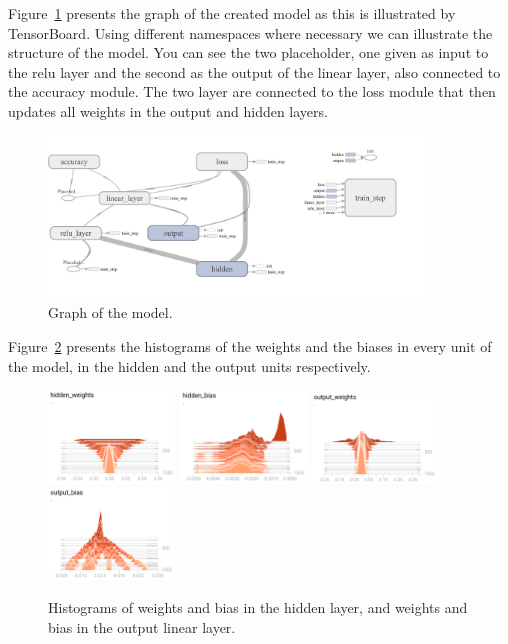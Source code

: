 \documentclass{article}
\begin{document}
Figure~\ref{fig:graph} presents the graph of the created model as this is illustrated by TensorBoard.
Using different namespaces where necessary we can illustrate the structure of the model.
You can see the two placeholder, one given as input to the relu layer and the second as the output of the linear layer, also connected to the accuracy module.
The two layer are connected to the loss module that then updates all weights in the output and hidden layers.



\begin{figure}
\centering
\includegraphics[width=0.9\textwidth]{graph.png}
\caption{Graph of the model.}
\label{fig:graph}
\end{figure}

Figure~\ref{fig:histogramsunits} presents the histograms of the weights and the biases in every unit of the model, in the hidden and the output units respectively.

\begin{figure}
\centering
\includegraphics[width=0.3\textwidth]{hidden_weights.png}
\includegraphics[width=0.3\textwidth]{hidden_bias.png}
\includegraphics[width=0.3\textwidth]{output_weights.png}
\includegraphics[width=0.3\textwidth]{output_bias.png}
\caption{Histograms of weights and bias in the hidden layer, and weights and bias in the output linear layer.}
\label{fig:histogramsunits}
\end{figure}
\end{document}
